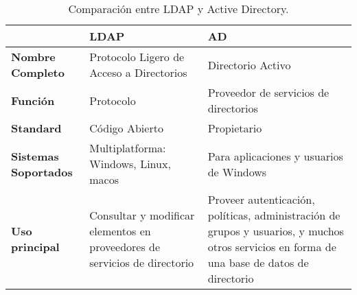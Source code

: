 \begin{table}[H]
	\centering
	\begin{tabular}{ |p{4cm}||p{4cm}|p{4cm}| }
		\hline
		 &\textbf{LDAP}&\textbf{AD}\\
		\hline
		\textbf{Nombre Completo }  &  Protocolo Ligero de Acceso a Directorios  &Directorio Activo\\
		\hline
		\textbf{Función}& Protocolo&Proveedor de servicios de directorios\\
		\hline
		\textbf{Standard} &Código Abierto & Propietario\\
		\hline
		\textbf{Sistemas Soportados}&Multiplatforma: Windows, Linux, macos & Para aplicaciones y usuarios de Windows\\
		\hline
		\textbf{Uso principal}&   Consultar y modificar elementos en proveedores de servicios de directorio & Proveer autenticación, políticas, administración de grupos y usuarios, y muchos otros servicios en forma de una base de datos de directorio\\
		\hline
	\end{tabular}
	\caption{\label{tab:table-name}Comparación entre LDAP y Active Directory.}
\end{table}